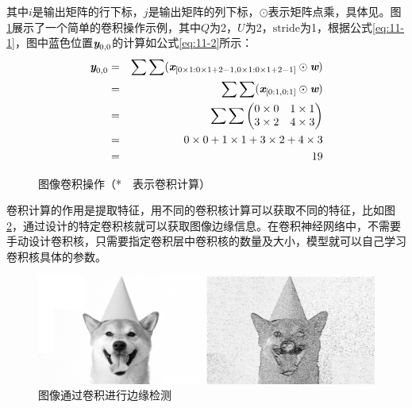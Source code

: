 \noindent 其中$i$是输出矩阵的行下标，$j$是输出矩阵的列下标，$\odot$表示矩阵点乘，具体见{\chapternine}。图\ref{fig:11-4}展示了一个简单的卷积操作示例，其中$Q$为2，$U$为2，$\textrm{stride}$为1，根据公式\eqref{eq:11-1}，图中蓝色位置$\textbf{\em y}_{0,0}$的计算如公式\eqref{eq:11-2}所示：
\begin{eqnarray}
\textbf{\em y}_{0,0} &=& \sum \sum ( \textbf{\em x}_{[0\times 1:0\times 1+2-1,0\times 1:0\times 1+2-1]} \odot \textbf{\em w}) \nonumber \\
			 &=& \sum \sum ( \textbf{\em x}_{[0:1,0:1]} \odot \textbf{\em w} ) \nonumber \\
&=& \sum \sum \begin{pmatrix}
   0\times 0 & 1\times1\\
   3\times2 & 4\times3
\end{pmatrix} \nonumber \\
			 &=& 0 \times 0 + 1 \times 1 + 3 \times 2 + 4 \times 3 \nonumber \\
			 &=& 19
\label{eq:11-2}
\end{eqnarray}

\begin{figure}[htp]
\centering

\caption{图像卷积操作（*\ \ 表示卷积计算）}
\label{fig:11-4}
\end{figure}

\parinterval 卷积计算的作用是提取特征，用不同的卷积核计算可以获取不同的特征，比如图\ref{fig:11-5}，通过设计的特定卷积核就可以获取图像边缘信息。在卷积神经网络中，不需要手动设计卷积核，只需要指定卷积层中卷积核的数量及大小，模型就可以自己学习卷积核具体的参数。

\begin{figure}[htp]
\centering
%
\includegraphics[scale=0.3]{./Chapter11/Figures/figure-dog-1.jpg}
\caption{图像通过卷积进行边缘检测}
\label{fig:11-5}
\end{figure}

